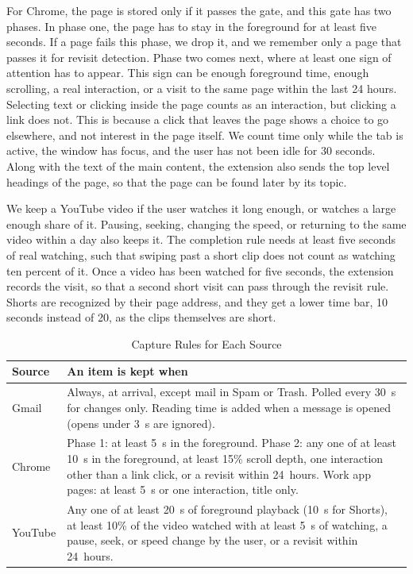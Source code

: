 \documentclass[conference]{IEEEtran}
\begin{document}
For Chrome, the page is stored only if it passes the gate, and this gate has two phases. In phase one, the page has to stay in the foreground for at least five seconds. If a page fails this phase, we drop it, and we remember only a page that passes it for revisit detection. Phase two comes next, where at least one sign of attention has to appear. This sign can be enough foreground time, enough scrolling, a real interaction, or a visit to the same page within the last 24 hours. Selecting text or clicking inside the page counts as an interaction, but clicking a link does not. This is because a click that leaves the page shows a choice to go elsewhere, and not interest in the page itself. We count time only while the tab is active, the window has focus, and the user has not been idle for 30 seconds. Along with the text of the main content, the extension also sends the top level headings of the page, so that the page can be found later by its topic.

We keep a YouTube video if the user watches it long enough, or watches a large enough share of it. Pausing, seeking, changing the speed, or returning to the same video within a day also keeps it. The completion rule needs at least five seconds of real watching, such that swiping past a short clip does not count as watching ten percent of it. Once a video has been watched for five seconds, the extension records the visit, so that a second short visit can pass through the revisit rule. Shorts are recognized by their page address, and they get a lower time bar, 10 seconds instead of 20, as the clips themselves are short.

\begin{table}[t]
\caption{Capture Rules for Each Source}
\label{tab:gates}
\centering
\renewcommand{\arraystretch}{1.05}
\begin{tabular}{|>{\raggedright\arraybackslash}p{1.35cm}|>{\raggedright\arraybackslash}p{6.2cm}|}
\hline
\textbf{Source} & \textbf{An item is kept when} \\
\hline
Gmail & Always, at arrival, except mail in Spam or Trash. Polled every 30~s for changes only. Reading time is added when a message is opened (opens under 3~s are ignored). \\
\hline
Chrome & Phase 1: at least 5~s in the foreground. Phase 2: any one of at least 10~s in the foreground, at least 15\% scroll depth, one interaction other than a link click, or a revisit within 24~hours. Work app pages: at least 5~s or one interaction, title only. \\
\hline
YouTube & Any one of at least 20~s of foreground playback (10~s for Shorts), at least 10\% of the video watched with at least 5~s of watching, a pause, seek, or speed change by the user, or a revisit within 24~hours. \\
\hline
\end{tabular}
\end{table}
\end{document}
